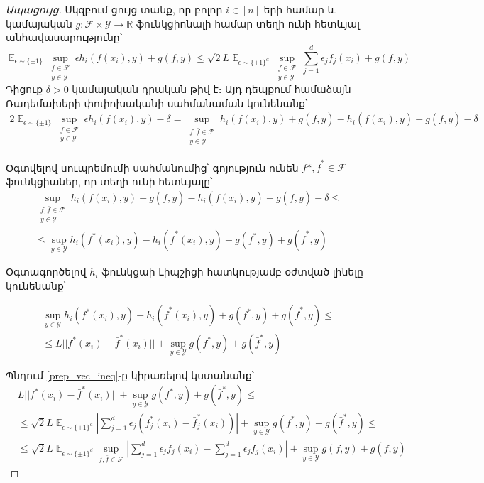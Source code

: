 \documentclass[11pt]{article}
\DeclareMathOperator*{\E}{\mathbb{E}}
\begin{document}
\begin{proof}[Ապացույց]
Սկզբում ցույց տանք, որ բոլոր $i \in [n]$-երի համար և կամայական $g:\mathcal{F}\times \mathcal{Y} \rightarrow \mathbb{R}$  ֆունկցիոնալի համար տեղի ունի հետևյալ անհավասարությունը՝
\begin{equation}
\label{sup_ineq}
\E_{\epsilon \sim \{\pm1\}}\sup_{\substack{f \in \mathcal{F} \\ y \in \mathcal{Y}}}    {\epsilon h_i(f(x_i), y)} + g(f, y)   \leq    \sqrt{2}L 
\E_{\epsilon \sim \{\pm1\}^d}\sup_{\substack{f \in \mathcal{F} \\ y \in \mathcal{Y}}}      {   \sum_{j=1}^d    \epsilon_jf_j(x_i)} + g(f, y)
\end{equation}
Դիցուք $\delta > 0$ կամայական դրական թիվ է։ Այդ դեպքում համաձայն Ռադեմախերի փոփոխականի սահմանաման կունենանք՝
\begin{align*}
 2\E_{\epsilon \sim \{\pm1\}}\sup_{\substack{f \in \mathcal{F} \\ y \in \mathcal{Y}}}    {\epsilon h_i(f(x_i), y)} - \delta  
= \sup_{\substack{f, \bar{f} \in \mathcal{F}  \\ y \in \mathcal{Y}}}    {h_i(f(x_i), y)  + g(\bar{f}, y) - h_i(\bar{f}(x_i), y) + g(\bar{f}, y) - \delta}
\end{align*}

Օգտվելով սուպրեմումի սահմանումից՝ գոյություն ունեն $f*, \bar{f}^* \in \mathcal{F}$ ֆունկցիաներ, որ տեղի ունի հետևյալը՝
\begin{align*}
 &\sup_{\substack{f, \bar{f} \in \mathcal{F}  \\ y \in \mathcal{Y}}}    {h_i(f(x_i), y)  + g(\bar{f}, y) - h_i(\bar{f}(x_i), y) + g(\bar{f}, y) -\delta}  \leq \\
 &\leq \sup_{y \in \mathcal{Y}}   h_i(f^*(x_i), y) - h_i(\bar{f}^*(x_i), y) + g(f^*, y) + g(\bar{f}^*, y)
\end{align*}

Օգտագործելով $h_i$ ֆունկցաի Լիպշիցի հատկությամբ օժտված լինելը կունենանք՝ 

\begin{align*}
 &\sup_{y \in \mathcal{Y}}   h_i(f^*(x_i), y) - h_i(\bar{f}^*(x_i), y) + g(f^*, y) + g(\bar{f}^*, y) \leq \\
& \leq   {L||f^*(x_i) - \bar{f}^*(x_i)||} + \sup_{y \in \mathcal{Y}}  g(f^*, y) + g(\bar{f}^*, y)
\end{align*}

Պնդում \ref{prep_vec_ineq}-ը կիրառելով կստանանք՝
\begin{align*}
 &{L||f^*(x_i) - \bar{f}^*(x_i)||} + \sup_{y \in \mathcal{Y}}  g(f^*, y) + g(\bar{f}^*, y) \leq \\
& \leq  {\sqrt{2}L} \E_{\epsilon \sim \{\pm 1\}^d}    \left |  \sum_{j=1}^d \epsilon_j (f^*_j(x_i) - \bar{f}_j^*(x_i))  \right|                    + \sup_{y \in \mathcal{Y}}    g(f^*, y) + g(\bar{f}^*, y)  \leq \\
&\leq  {\sqrt{2}L} \E_{\epsilon \sim \{\pm 1\}^d}        \sup_{f, \bar{f} \in \mathcal{F}}      \left |  \sum_{j=1}^d \epsilon_j f_j(x_i) - \sum_{j=1}^d \epsilon_j\bar{f}_j(x_i)  \right|                    + \sup_{y \in \mathcal{Y}}    g(f, y) + g(\bar{f}, y) 
\end{align*}


\end{proof}
\end{document}
